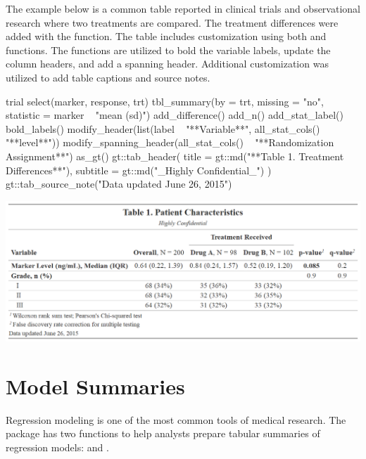 The example below is a common table reported in clinical trials and observational research where two treatments are compared.
The treatment differences were added with the  function.
The table includes customization using both  and  functions.
The  functions are utilized to bold the variable labels,  update the column headers, and add a spanning header.
Additional  customization was utilized to add table captions and source notes.

\begin{example}
trial %
  select(marker, response, trt) %
  tbl_summary(by = trt,
              missing = "no",
              statistic = marker ~ "{mean} ({sd})") %
  add_difference() %
  add_n() %
  add_stat_label() %
  bold_labels() %
  modify_header(list(label ~ "**Variable**", all_stat_cols() ~ "**{level}**")) %
  modify_spanning_header(all_stat_cols() ~ "**Randomization Assignment**") %
  as_gt() %
  gt::tab_header(
    title = gt::md("**Table 1. Treatment Differences**"),
    subtitle = gt::md("_Highly Confidential_")
  ) %
  gt::tab_source_note("Data updated June 26, 2015")
\end{example}
\begin{widefigure}[h!]
  \includegraphics[scale=0.73]{custom.png}
  \centering
\end{widefigure}

\section{Model Summaries}

Regression modeling is one of the most common tools of medical research.
The  package has two functions to help analysts prepare tabular summaries of regression models:  and .

\subsection{\texorpdfstring{}{tbl\_regression()}}

